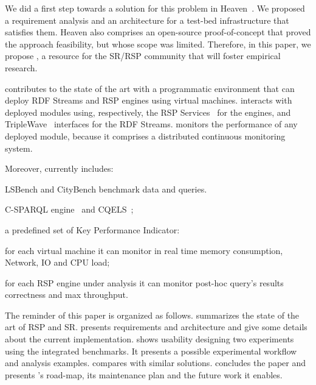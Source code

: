 We did a first step towards a solution for 
this problem in Heaven~\cite{heaven}.
We proposed a requirement analysis and an
architecture for a 
test-bed infrastructure that satisfies them.
Heaven also comprises an open-source
proof-of-concept that 
proved the approach feasibility, but
whose scope was limited.
Therefore, in this paper, we propose \rsplab, 
a resource for the SR/RSP community 
that will foster empirical research. 

\rsplab contributes to the state of the art 
with a programmatic environment that can 
deploy RDF Streams and RSP engines
using virtual machines. 
\rsplab interacts with deployed modules 
using, respectively,
the RSP Services~\cite{rspservices} 
for the engines,
and TripleWave~\cite{triplewave} 
interfaces for the RDF Streams. 
\rsplab monitors the performance 
of any deployed module, 
because it comprises a distributed 
continuous monitoring system.

Moreover, \rsplab currently 
includes: 
\begin{inparaenum}[(i)] 
\item LSBench and CityBench benchmark data and queries.
\item C-SPARQL engine~\cite{csparql} and CQELS~\cite{cqels}; 
\item a predefined set of Key Performance Indicator: 
\begin{inparaenum}[(a)]  
\item for each virtual machine it can monitor in real time
memory consumption, Network, IO and CPU load; 
\item for each RSP engine under analysis it can monitor post-hoc
query's results correctness and max throughput.
\end{inparaenum}
\end{inparaenum}
 

The reminder of this paper is organized as follows. 
 summarizes the state of the art of RSP and SR.
 presents \rsplab requirements and architecture
and give some details about the current implementation.
 shows \rsplab usability designing two experiments
using the integrated benchmarks. It presents a possible
experimental workflow and analysis examples.
 compares \rsplab with similar solutions.
 concludes the paper and presents
\rsplab's road-map, its maintenance plan
and the future work it enables. 


 
